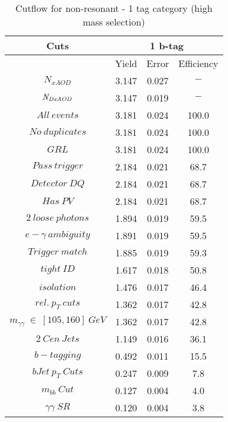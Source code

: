 \begin{table}\footnotesize
\begin{center} 
    \caption{Cutflow for non-resonant \hhyybb - 1 tag category (high mass selection)}
    \label{tab:cutflow-nonres-1tag-high}
\begin{tabular}{|c|c|c|c|} 
 \hline 
Cuts& \multicolumn{3}{c|}{1 b-tag} \\ \hline 
 &Yield&Error&Efficiency\\ \hline 
$N_{xAOD}$ & 3.147&0.027 &$-$ \\ 
 \hline 
$\it{N}_{DxAOD}$ & 3.147&0.019 &$-$ \\ 
 \hline 
$All\ events$ & 3.181&0.024 &100.0 \\ 
 \hline 
$No\ duplicates$ & 3.181&0.024 &100.0 \\ 
 \hline 
$GRL$ & 3.181&0.024 &100.0 \\ 
 \hline 
$Pass\ trigger$ & 2.184&0.021 &68.7 \\ 
 \hline 
$Detector\ DQ$ & 2.184&0.021 &68.7 \\ 
 \hline 
$Has\ PV$ & 2.184&0.021 &68.7 \\ 
 \hline 
$2\ loose\ photons$ & 1.894&0.019 &59.5 \\ 
 \hline 
$e-\gamma\ ambiguity$ & 1.891&0.019 &59.5 \\ 
 \hline 
$Trigger\ match$ & 1.885&0.019 &59.3 \\ 
 \hline 
$tight\ ID$ & 1.617&0.018 &50.8 \\ 
 \hline 
$isolation$ & 1.476&0.017 &46.4 \\ 
 \hline 
$rel.\ p_{T}\ cuts$ & 1.362&0.017 &42.8 \\ 
 \hline 
$m_{\gamma\gamma}\ \in\ [105,160]\ GeV$ & 1.362&0.017 &42.8 \\ 
 \hline 
$2\ Cen\ Jets$ & 1.149&0.016 &36.1 \\ 
 \hline 
$b-tagging$ & 0.492&0.011 &15.5 \\ 
 \hline 
$bJet\ p_{T}\ Cuts$ & 0.247&0.009 & 7.8 \\ 
 \hline 
$m_{bb}\ Cut$ & 0.127&0.004 & 4.0 \\ 
 \hline 
$\gamma\gamma\ SR$ & 0.120&0.004 & 3.8 \\ 
 \hline 
\end{tabular}
\end{center}
\end{table}
